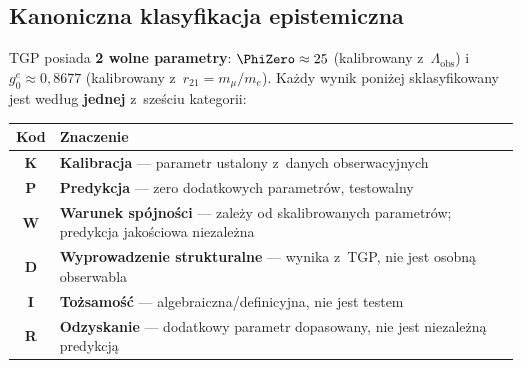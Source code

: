 %
%

\subsection*{Kanoniczna klasyfikacja epistemiczna}
\label{ssec:epistemic-table}

\noindent
TGP posiada \textbf{2 wolne parametry}:
$\PhiZero \approx 25$ (kalibrowany z~$\Lambda_{\mathrm{obs}}$)
i~$g_0^e \approx 0{,}8677$ (kalibrowany z~$r_{21} = m_\mu/m_e$).
Ka\.zdy wynik poni\.zej sklasyfikowany jest wed\l{}ug
\textbf{jednej} z~sze\'sciu kategorii:

\smallskip
\begin{center}\footnotesize
\begin{tabular}{@{}cl@{}}
\toprule
\textbf{Kod} & \textbf{Znaczenie} \\
\midrule
\textbf{K} & \textbf{Kalibracja} --- parametr ustalony z~danych obserwacyjnych \\
\textbf{P} & \textbf{Predykcja} --- zero dodatkowych parametr\'ow, testowalny \\
\textbf{W} & \textbf{Warunek sp\'ojno\'sci} --- zale\.zy od skalibrowanych parametr\'ow;
              predykcja jako\'sciowa niezale\.zna \\
\textbf{D} & \textbf{Wyprowadzenie strukturalne} --- wynika z~TGP, nie jest osobn\k{a} obserwabla \\
\textbf{I} & \textbf{To\.zsamo\'s\'c} --- algebraiczna/definicyjna, nie jest testem \\
\textbf{R} & \textbf{Odzyskanie} --- dodatkowy parametr dopasowany, nie jest niezale\.zn\k{a} predykcj\k{a} \\
\bottomrule
\end{tabular}
\end{center}

